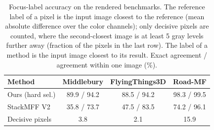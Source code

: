 \begin{table}[t]
\centering
\scriptsize
\caption{Focus-label accuracy on the rendered benchmarks. The reference label of a pixel is the input image closest to the reference (mean absolute difference over the color channels); only decisive pixels are counted, where the second-closest image is at least 5 gray levels further away (fraction of the pixels in the last row). The label of a method is the input image closest to its result. Exact agreement / agreement within one image (\%).}
\label{tab:label}
\begin{tabular}{lccc}
\toprule
Method & Middlebury & FlyingThings3D & Road-MF \\
\midrule
Ours (hard sel.) & 89.9 / 94.2 & 88.5 / 94.2 & 98.3 / 99.5 \\
StackMFF V2 & 35.8 / 73.7 & 47.5 / 83.5 & 74.2 / 96.1 \\
\midrule
Decisive pixels & 3.8 & 2.1 & 15.9 \\
\bottomrule
\end{tabular}
\end{table}
